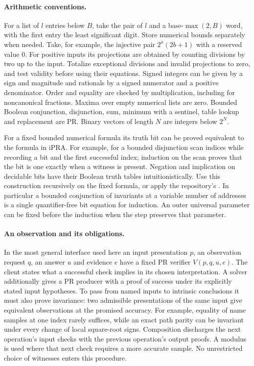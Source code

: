 \paragraph{Arithmetic conventions.}
For a list of $l$ entries below $B$, take the pair of $l$ and a base-$\max(2,B)$ word, with the first entry the least significant digit. Store numerical bounds separately when needed. Take, for example, the injective pair $2^a(2b+1)$ with a reserved value $0$. For positive inputs its projections are obtained by counting divisions by two up to the input. Totalize exceptional divisions and invalid projections to zero, and test validity before using their equations. Signed integers can be given by a sign and magnitude and rationals by a signed numerator and a positive denominator. Order and equality are checked by multiplication, including for noncanonical fractions. Maxima over empty numerical lists are zero. Bounded Boolean conjunction, disjunction, sum, minimum with a sentinel, table lookup and replacement are PR. Binary vectors of length $N$ are integers below $2^N$.

For a fixed bounded numerical formula its truth bit can be proved equivalent to the formula in iPRA. For example, for a bounded disjunction scan indices while recording a bit and the first successful index; induction on the scan proves that the bit is one exactly when a witness is present. Negation and implication on decidable bits have their Boolean truth tables intuitionistically. Use this construction recursively on the fixed formula, or apply the repository's . In particular a bounded conjunction of invariants at a variable number of addresses is a single quantifier-free bit equation for induction. An outer universal parameter can be fixed before the induction when the step preserves that parameter.

\paragraph{An observation and its obligations.}
In the most general interface used here an input presentation $p$, an observation request $q$, an answer $u$ and evidence $e$ have a fixed PR verifier $V(p,q,u,e)$. The client states what a successful check implies in its chosen interpretation. A solver additionally gives a PR producer with a proof of success under its explicitly stated input hypotheses. To pass from named inputs to intrinsic conclusions it must also prove invariance: two admissible presentations of the same input give equivalent observations at the promised accuracy. For example, equality of name samples at one index rarely suffices, while an exact path parity can be invariant under every change of local square-root signs. Composition discharges the next operation's input checks with the previous operation's output proofs. A modulus is used where that next check requires a more accurate sample. No unrestricted choice of witnesses enters this procedure.


